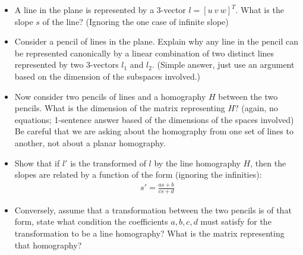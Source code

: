 \documentclass[11pt]{article}
\begin{document}
\begin{itemize}

\item A line in the plane is represented by a 3-vector $l = [u\ v\ w]^T$. What is the slope $s$ of the line? (Ignoring the one case of infinite slope)

\item Consider a pencil of lines in the plane. Explain why any line in the pencil can be represented canonically by a linear combination of two distinct
lines represented by two 3-vectors $l_1$ and $l_2$. (Simple answer, just use an argument based on the dimension of the subspaces involved.)

\item Now consider two pencils of lines and a homography $H$ between the two pencils. 
What is the dimension of the matrix representing $H$? (again, no equations; 
1-sentence answer based of the dimensions of the spaces involved) Be careful that we are asking about the homography from one set of lines to another, not about a planar homography.

\item  Show that if $l'$ is the transformed of $l$ by the line homography $H$, then the slopes 
are related by a function of the form (ignoring the infinities):
\begin{align*}
s' = \frac{as+b}{cs+d}
\end{align*}

\item Conversely, assume that a transformation between the two pencils is of that form, state what condition the coefficients $a,b,c,d$ must
satisfy for the transformation to be a line homography? What is the matrix representing that homography?
\end{itemize}
\end{document}
